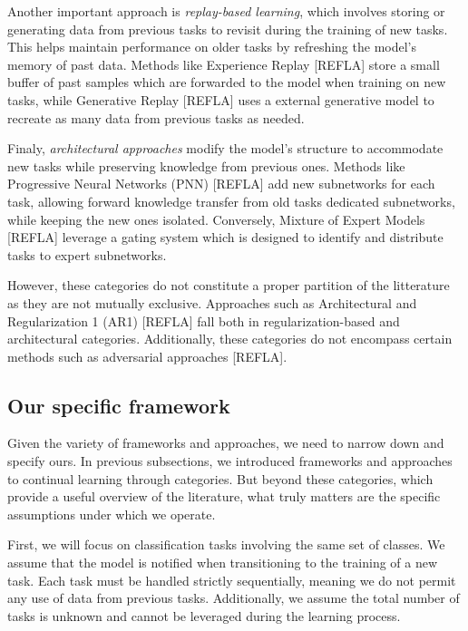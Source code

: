 \documentclass[11pt]{article}
\begin{document}
\vspace{2mm}
\noindent
Another important approach is \textit{replay-based learning}, which involves storing or generating data from previous tasks to revisit during the training of new tasks. This helps maintain performance on older tasks by refreshing the model's memory of past data. Methods like Experience Replay [REFLA] store a small buffer of past samples which are forwarded to the model when training on new tasks, while Generative Replay [REFLA] uses a external generative model to recreate as many data from previous tasks as needed. 

\vspace{2mm}
\noindent
Finaly, \textit{architectural approaches} modify the model's structure to accommodate new tasks while preserving knowledge from previous ones. Methods like Progressive Neural Networks (PNN) [REFLA] add new subnetworks for each task, allowing forward knowledge transfer from old tasks dedicated subnetworks, while keeping the new ones isolated. Conversely, Mixture of Expert Models [REFLA] leverage a gating system which is designed to identify and distribute tasks to expert subnetworks.

\vspace{2mm}
\noindent
However, these categories do not constitute a proper partition of the litterature as they are not mutually exclusive. Approaches such as Architectural and Regularization 1 (AR1) [REFLA] fall both in regularization-based and architectural categories. Additionally, these categories do not encompass certain methods such as adversarial approaches [REFLA].


\subsection{Our specific framework}


Given the variety of frameworks and approaches, we need to narrow down and specify ours. In previous subsections, we introduced frameworks and approaches to continual learning through categories. But beyond these categories, which provide a useful overview of the literature, what truly matters are the specific assumptions under which we operate.

\vspace{2mm}
\noindent
First, we will focus on classification tasks involving the same set of classes. We assume that the model is notified when transitioning to the training of a new task. Each task must be handled strictly sequentially, meaning we do not permit any use of data from previous tasks. Additionally, we assume the total number of tasks is unknown and cannot be leveraged during the learning process.
\end{document}
